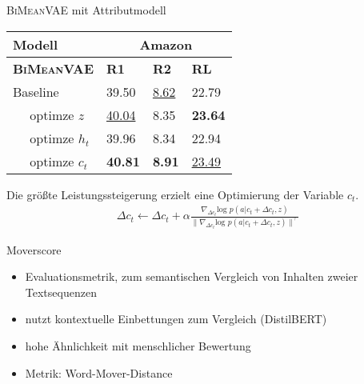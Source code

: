 \begin{frame}{\textsc{BiMeanVAE} mit Attributmodell}
  \begin{table}[h!]
      \centering
      \begin{tabular}{@{}llll@{}}
      \toprule
                      Modell   & \multicolumn{3}{c}{Amazon}              \\ \midrule
      \textbf{\textsc{BiMeanVAE}}    & \textbf{R1} & \textbf{R2} & \textbf{RL} \\ \midrule
      Baseline        & 39.50       & \underline{8.62}     &  22.79     \\
      $\quad$ optimze $z$        &   \underline{40.04}     &   8.35    &    \textbf{23.64}   \\
      $\quad$ optimze $h_t$      &  39.96   &    8.34  &  22.94  \\
      $\quad$ optimze $c_t$      &  \textbf{40.81}   &     \textbf{8.91}  &   \underline{23.49}    \\ \bottomrule
      \end{tabular}

  \end{table}
 Die größte Leistungssteigerung erzielt eine Optimierung der Variable $c_t$.
  \begin{align}
      \Delta c_t \leftarrow \Delta c_t + \alpha \frac{\nabla_{\Delta c_t} \text{log }p(a|c_t+\Delta c_t,z)}{\| \nabla_{\Delta c_t} \text{log }p(a|c_t +\Delta c_t ,z )\|^\gamma} \label{opt_lstm}
  \end{align}
  
\end{frame}

\begin{frame}{Moverscore}
  \begin{itemize}
    \item Evaluationsmetrik, zum semantischen Vergleich von Inhalten zweier Textsequenzen
    \item nutzt kontextuelle Einbettungen zum Vergleich (DistilBERT)
    \item hohe Ähnlichkeit mit menschlicher Bewertung
    \item Metrik: Word-Mover-Distance
  \end{itemize}
\end{frame}

